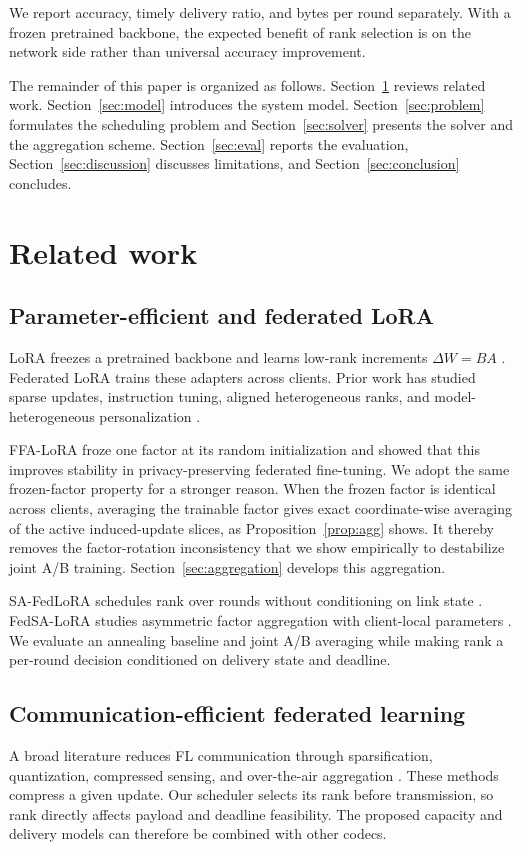 \documentclass[preprint,12pt]{elsarticle}
\begin{document}
We report accuracy, timely delivery ratio, and bytes per round separately. With a frozen pretrained backbone, the expected benefit of rank selection is on the network side rather than universal accuracy improvement.

The remainder of this paper is organized as follows. Section~\ref{sec:related} reviews related work. Section~\ref{sec:model} introduces the system model. Section~\ref{sec:problem} formulates the scheduling problem and Section~\ref{sec:solver} presents the solver and the aggregation scheme. Section~\ref{sec:eval} reports the evaluation, Section~\ref{sec:discussion} discusses limitations, and Section~\ref{sec:conclusion} concludes.

\section{Related work}
\label{sec:related}

\subsection{Parameter-efficient and federated LoRA}
LoRA freezes a pretrained backbone and learns low-rank increments $\Delta W=BA$ \cite{hu2022lora}. Federated LoRA trains these adapters across clients. Prior work has studied sparse updates, instruction tuning, aligned heterogeneous ranks, and model-heterogeneous personalization \cite{babakniya2023slora,zhang2024fedit,wang2024flora,yi2024fedlora}.

FFA-LoRA \cite{sun2024ffalora} froze one factor at its random initialization and showed that this improves stability in privacy-preserving federated fine-tuning. We adopt the same frozen-factor property for a stronger reason. When the frozen factor is identical across clients, averaging the trainable factor gives exact coordinate-wise averaging of the active induced-update slices, as Proposition~\ref{prop:agg} shows. It thereby removes the factor-rotation inconsistency that we show empirically to destabilize joint A/B training. Section~\ref{sec:aggregation} develops this aggregation.

SA-FedLoRA schedules rank over rounds without conditioning on link state \cite{yang2024safedlora}. FedSA-LoRA studies asymmetric factor aggregation with client-local parameters \cite{guo2025fedsalora}. We evaluate an annealing baseline and joint A/B averaging while making rank a per-round decision conditioned on delivery state and deadline.

\subsection{Communication-efficient federated learning}
A broad literature reduces FL communication through sparsification, quantization, compressed sensing, and over-the-air aggregation \cite{oh2023fedqcs,oh2024fedvqcs,liu2023adaptivequant,kim2023beamforming,reisizadeh2020fedpaq,lin2018deep}. These methods compress a given update. Our scheduler selects its rank before transmission, so rank directly affects payload and deadline feasibility. The proposed capacity and delivery models can therefore be combined with other codecs.
\end{document}
